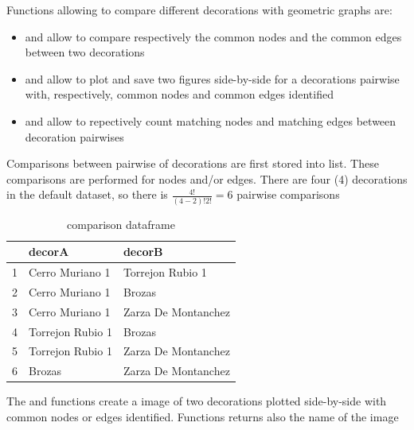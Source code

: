 \documentclass[article]{jss}
\begin{document}
Functions allowing to compare different decorations with geometric graphs are:

\begin{itemize}
  \item {} and  allow to compare respectively the common nodes and the common edges between two decorations
  \item {} and  allow to plot and save two figures side-by-side for a decorations pairwise with, respectively, common nodes and common edges identified
  \item {} and  allow to repectively count matching nodes and matching edges between decoration pairwises
\end{itemize}

Comparisons between pairwise of decorations are first stored into list. These comparisons are performed for nodes and/or edges. There are four (4) decorations in the default dataset, so there is $\frac{4!}{(4-2)!2!}={6}$ pairwise comparisons

\begin{table}[ht]
\centering
\begin{tabular}{rll}
  \hline
 & decorA & decorB \\ 
  \hline
1 & Cerro Muriano 1 & Torrejon Rubio 1 \\ 
  2 & Cerro Muriano 1 & Brozas \\ 
  3 & Cerro Muriano 1 & Zarza De Montanchez \\ 
  4 & Torrejon Rubio 1 & Brozas \\ 
  5 & Torrejon Rubio 1 & Zarza De Montanchez \\ 
  6 & Brozas & Zarza De Montanchez \\ 
   \hline
\end{tabular}
\caption{comparison dataframe} 
\label{Test_table_1}
\end{table}
The and  functions create a  image of two decorations plotted side-by-side with common nodes or edges identified. Functions returns also the name of the image 
\end{document}
